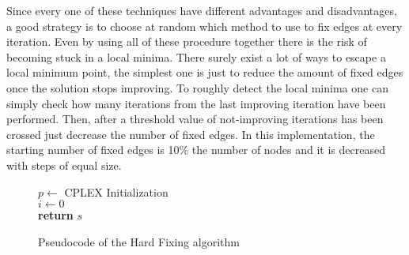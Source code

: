 Since every one of these techniques have different advantages and disadvantages, a good strategy is to choose at random which method to use to fix edges at every iteration.
Even by using all of these procedure together there is the risk of becoming stuck in a local minima.
There surely exist a lot of ways to escape a local minimum point, the simplest one is just to reduce the amount of fixed edges once the solution stops improving.
To roughly detect the local minima one can simply check how many iterations from the last improving iteration have been performed.
Then, after a threshold value of not-improving iterations has been crossed just decrease the number of fixed edges.
In this implementation, the starting number of fixed edges is 10\% the number of nodes and it is decreased with steps of equal size.
\begin{figure}[htbp]
	\begin{algorithm}[H]
		\vspace{2mm}
        $p \gets$ CPLEX Initialization \\
        $i \gets 0$ \\ 
        \textbf{return} $s$
	\end{algorithm}
	\caption{Pseudocode of the Hard Fixing algorithm} \label{fig:hardfix}
\end{figure}

